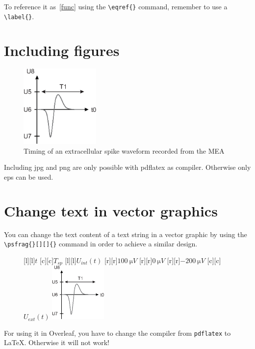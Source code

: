 To reference it as~\eqref{func} using the \verb+\eqref{}+ command,
remember to use a \verb+\label{}+.
\section{Including figures}
\begin{figure}[ht]    \centering
    \includegraphics[width=0.35\textwidth]{figures/example.eps}
    \caption{Timing of an extracellular spike waveform recorded from the MEA}
    \label{fig:NeuronSetup0}
\end{figure}
Including jpg and png are only possible with pdflatex as compiler. Otherwise only eps can be used.

\newpage
\section{Change text in vector graphics}
You can change the text content of a text string in a vector graphic by using the \verb+\psfrag{}[][]{}+ command in order to achieve a similar design.
\begin{figure}[ht]  \centering
    [l][l]{$t$}
    [c][c]{$T_{sp}$}
    [l][l]{$U_{int}(t)$}
    [r][r]{$\SI{100}{\micro V}$}
    [r][r]{$\SI{0}{\micro V}$}
    [r][r]{$\SI{-200}{\micro V}$}
    [c][c]{$U_{ext}(t)$}
    \includegraphics[width=0.25\textwidth]{figures/example.eps}
    \label{fig:TutorialNeuron1}
\end{figure}
For using it in Overleaf, you have to change the compiler from \verb+pdflatex+ to LaTeX. Otherwise it will not work!

